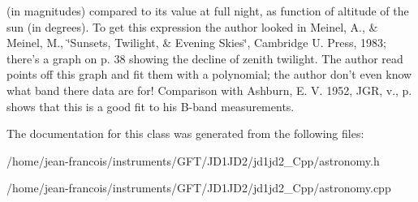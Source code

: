(in magnitudes) compared to its value at full night, as function of altitude of the sun (in degrees). To get this expression the author looked in Meinel, A., \& Meinel, M., \char`\"{}\-Sunsets, Twilight, \& Evening Skies\char`\"{}, Cambridge U. Press, 1983; there's a graph on p. 38 showing the decline of zenith twilight. The author read points off this graph and fit them with a polynomial; the author don't even know what band there data are for! Comparison with Ashburn, E. V. 1952, J\-G\-R, v., p. shows that this is a good fit to his B-\/band measurements. 

The documentation for this class was generated from the following files\-:\begin{DoxyCompactItemize}
\item 
/home/jean-\/francois/instruments/\-G\-F\-T/\-J\-D1\-J\-D2/jd1jd2\-\_\-\-Cpp/astronomy.\-h\item 
/home/jean-\/francois/instruments/\-G\-F\-T/\-J\-D1\-J\-D2/jd1jd2\-\_\-\-Cpp/astronomy.\-cpp\end{DoxyCompactItemize}
